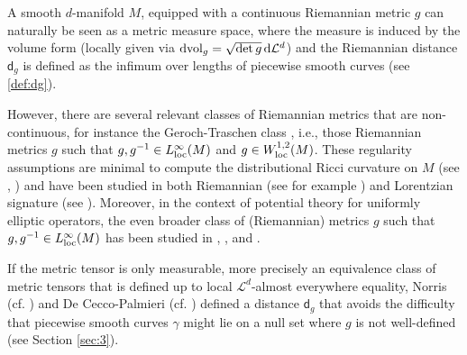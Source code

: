 \documentclass[a4paper,10pt]{article}
\numberwithin{equation}{section}
\newcommand{\vol}{\mathrm{vol}}
\newcommand{\sfd}{\mathsf d}
\newcommand{\di}{{\rm d}}
\begin{document}
A smooth $d$-manifold $M$, equipped with a continuous Riemannian metric $g$ can naturally be seen as a metric measure space, where the measure is induced by the volume form (locally given via $\di\vol_g= \sqrt{\det g}\, \di \mathcal{L}^d$) and the Riemannian distance $\sfd_g$ is defined as the infimum over lengths of piecewise smooth curves (see \eqref{def:dg}).

However, there are several relevant classes of Riemannian metrics that are non-continuous, for instance the Geroch-Traschen class \cite{geroch1987strings}, i.e., those Riemannian metrics $g$ such that $g, g^{-1} \in L^\infty_{\rm loc}(M)$ and $g \in W^{1,2}_{\rm loc}(M)$. These regularity assumptions are minimal to compute the distributional Ricci curvature on $M$ (see \cite{grosser2013geometric}, \cite{graf2020singularity}) and have been studied in both Riemannian (see for example \cite{grant2011synthetic}) and Lorentzian signature (see \cite{steinbauer2009geroch}). Moreover, in the context of potential theory for uniformly elliptic operators, the even broader class of (Riemannian) metrics $g$ such that $g, g^{-1} \in L^\infty_{\rm loc}(M)$ has been studied in \cite{saloff1992uniformly}, \cite{sturm1995analysis}, \cite{norris1997heat} and \cite{de1991integral}. 

If the metric tensor is only measurable, more precisely an equivalence class of metric tensors that is defined up to local $\mathcal{L}^d$-almost everywhere equality, Norris (cf. \cite{norris1997heat}) and De Cecco-Palmieri (cf. \cite{de1991integral}) defined a distance $\sfd_g$ that avoids the difficulty that piecewise smooth curves $\gamma$ might lie on a null set where $g$ is not well-defined (see Section \ref{sec:3}). 
\end{document}

